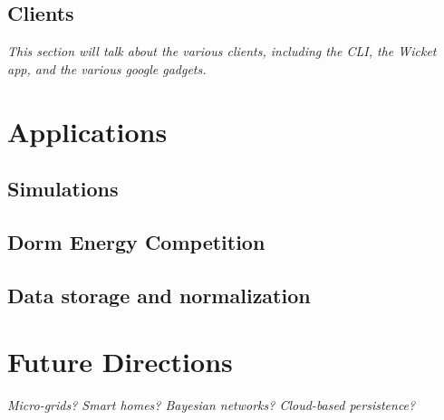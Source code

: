 \documentclass[conference,compsoc]{IEEEtran}
\begin{document}
\subsection{Clients}
\label{sec:clients}



{\em This section will talk about the various clients, including the CLI,
  the Wicket app, and the various google gadgets.}

\section{Applications}

\subsection{Simulations}

\subsection{Dorm Energy Competition}

\subsection{Data storage and normalization}

\section{Future Directions}

{\em Micro-grids? Smart homes? Bayesian networks? Cloud-based persistence?}



\end{document}
